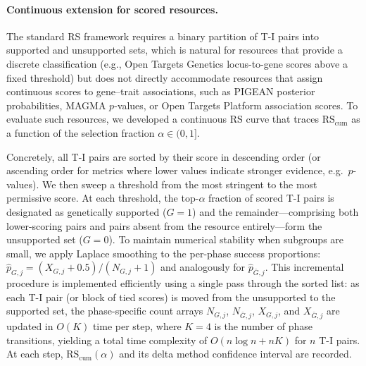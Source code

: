 \paragraph{Continuous extension for scored resources.}
The standard RS framework requires a binary partition of T-I pairs into supported and unsupported sets, which is natural for resources that provide a discrete classification (e.g., Open Targets Genetics locus-to-gene scores above a fixed threshold) but does not directly accommodate resources that assign continuous scores to gene--trait associations, such as PIGEAN posterior probabilities, MAGMA $p$-values, or Open Targets Platform association scores. To evaluate such resources, we developed a continuous RS curve that traces $\text{RS}_{\text{cum}}$ as a function of the selection fraction $\alpha \in (0, 1]$.


Concretely, all T-I pairs are sorted by their score in descending order (or ascending order for metrics where lower values indicate stronger evidence, e.g.\ $p$-values). We then sweep a threshold from the most stringent to the most permissive score. At each threshold, the top-$\alpha$ fraction of scored T-I pairs is designated as genetically supported ($G{=}1$) and the remainder---comprising both lower-scoring pairs and pairs absent from the resource entirely---form the unsupported set ($G{=}0$). To maintain numerical stability when subgroups are small, we apply Laplace smoothing to the per-phase success proportions: $\hat{p}_{G,j} = (X_{G,j} + 0.5)/(N_{G,j} + 1)$ and analogously for $\hat{p}_{\bar{G},j}$. This incremental procedure is implemented efficiently using a single pass through the sorted list: as each T-I pair (or block of tied scores) is moved from the unsupported to the supported set, the phase-specific count arrays $N_{G,j}$, $N_{\bar{G},j}$, $X_{G,j}$, and $X_{\bar{G},j}$ are updated in $O(K)$ time per step, where $K{=}4$ is the number of phase transitions, yielding a total time complexity of $O(n \log n + nK)$ for $n$ T-I pairs. At each step, $\text{RS}_{\text{cum}}(\alpha)$ and its delta method confidence interval are recorded.

